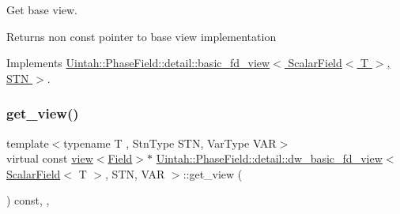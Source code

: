Get base view. 

\begin{DoxyReturn}{Returns}
non const pointer to base view implementation 
\end{DoxyReturn}


Implements \hyperlink{classUintah_1_1PhaseField_1_1detail_1_1basic__fd__view_3_01ScalarField_3_01T_01_4_00_01STN_01_4_a2bbf870b332cfd997ec5297428019bc8}{Uintah\+::\+Phase\+Field\+::detail\+::basic\+\_\+fd\+\_\+view$<$ Scalar\+Field$<$ T $>$, S\+T\+N $>$}.

\mbox{\label{classUintah_1_1PhaseField_1_1detail_1_1dw__basic__fd__view_3_01ScalarField_3_01T_01_4_00_01STN_00_01VAR_01_4_af125295808e73f3d236f85f45d054b23}} 
\subsubsection{\texorpdfstring{get\+\_\+view()}{get\_view()}\hspace{0.1cm}{\footnotesize\ttfamily [2/2]}}
{\footnotesize\ttfamily template$<$typename T , Stn\+Type S\+TN, Var\+Type V\+AR$>$ \\
virtual const \hyperlink{classUintah_1_1PhaseField_1_1detail_1_1view}{view}$<$\hyperlink{structUintah_1_1PhaseField_1_1ScalarField}{Field}$>$$\ast$ \hyperlink{classUintah_1_1PhaseField_1_1detail_1_1dw__basic__fd__view}{Uintah\+::\+Phase\+Field\+::detail\+::dw\+\_\+basic\+\_\+fd\+\_\+view}$<$ \hyperlink{structUintah_1_1PhaseField_1_1ScalarField}{Scalar\+Field}$<$ T $>$, S\+TN, V\+AR $>$\+::get\+\_\+view (\begin{DoxyParamCaption}{ }\end{DoxyParamCaption}) const\hspace{0.3cm}{\ttfamily [inline]}, {\ttfamily [override]}, {\ttfamily [virtual]}}



